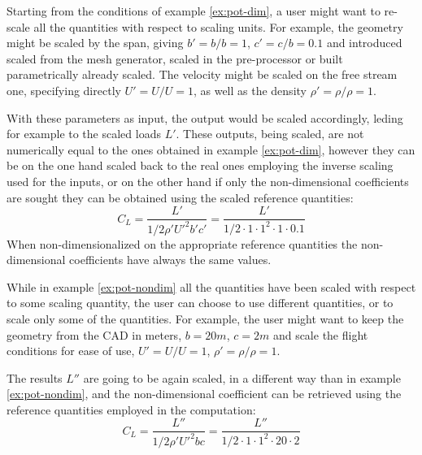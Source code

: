 \begin{example}
\label{ex:pot-nondim}
Starting from the conditions of example \ref{ex:pot-dim}, a user might want to re-scale all the quantities with respect to scaling units. For example, the geometry might be scaled by the span, giving $b' = b/b = 1$, $c'=c/b=0.1$ and introduced scaled from the mesh generator, scaled in the pre-processor or built parametrically already scaled. The velocity might be scaled on the free stream one, specifying directly $U'=U/U=1$, as well as the density $\rho' = \rho/\rho = 1$. 

With these parameters as input, the output would be scaled accordingly, leding for example to the scaled loads $L'$. These outputs, being scaled, are not numerically equal to the ones obtained in example \ref{ex:pot-dim}, however they can be on the one hand scaled back to the real ones employing the inverse scaling used for the inputs, or on the other hand if only the non-dimensional coefficients are sought they can be obtained using the scaled reference quantities:
\begin{equation*}
    C_L = \frac{L'}{1/2 \rho' U'^2 b' c'} = \frac{L'}{1/2 \cdot 1  \cdot 1^2 \cdot 1 \cdot 0.1}
\end{equation*}
When non-dimensionalized on the appropriate reference quantities the non-dimensional coefficients have always the same values.
\end{example}

\begin{example}
\label{ex:pot-part}
While in example \ref{ex:pot-nondim} all the quantities have been scaled with respect to some scaling quantity, the user can choose to use different quantities, or to scale only some of the quantities. For example, the user might want to keep the geometry from the CAD in meters, $b = 20 m$, $c = 2 m$ and scale the flight conditions for ease of use, $U'=U/U=1$, $\rho' = \rho/\rho = 1$. 

The results $L''$ are going to be again scaled, in a different way than in example \ref{ex:pot-nondim}, and the non-dimensional coefficient can be retrieved using the reference quantities employed in the computation:
\begin{equation*}
    C_L = \frac{L''}{1/2 \rho' U'^2 b c} = \frac{L''}{1/2 \cdot 1  \cdot 1^2 \cdot 20 \cdot 2}
\end{equation*}
\end{example}

